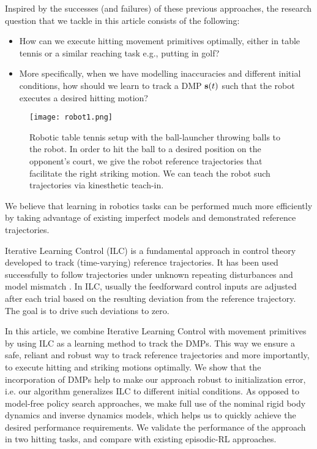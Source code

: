 Inspired by the successes (and failures) of these previous approaches, the research question that we tackle in this article consists of the following:
%
\begin{itemize}
\item How can we execute hitting movement primitives optimally, either in table tennis or a similar reaching task e.g., putting in golf?
%
\item More specifically, when we have modelling inaccuracies and different initial conditions, how should we learn to track a DMP $\boldsymbol{\mathrm{s}}(t)$ such that the robot executes a desired hitting motion?
\end{itemize}
%
\begin{figure}[b!]
\center
\texttt{[image: robot1.png]}			
\caption{Robotic table tennis setup with the ball-launcher throwing balls to the robot. In order to hit the ball to a desired position on the opponent's court, we give the robot reference trajectories that facilitate the right striking motion. We can teach the robot such trajectories via kinesthetic teach-in.}
\label{robot}
\end{figure}
%
\noindent We believe that learning in robotics tasks can be performed much more efficiently by taking advantage of existing imperfect models and demonstrated reference trajectories. 

Iterative Learning Control (ILC) is a fundamental approach in control theory developed to track (time-varying) reference trajectories. It has been used successfully to follow trajectories under unknown repeating disturbances and model mismatch \cite{Bristow06}. In ILC, usually the feedforward control inputs are adjusted after each trial based on the resulting deviation from the reference trajectory. The goal is to drive such deviations to zero. 

In this article, we combine Iterative Learning Control with movement primitives by using ILC as a learning method to track the DMPs. This way we ensure a safe, reliant and robust way to track reference trajectories and more importantly, to execute hitting and striking motions optimally. We show that the incorporation of DMPs help to make our approach robust to initialization error, i.e. our algorithm generalizes ILC to different initial conditions. As opposed to model-free policy search approaches, we make full use of the nominal rigid body dynamics and inverse dynamics models, which helps us to quickly achieve the desired performance requirements. We validate the performance of the approach in two hitting tasks, and compare with existing episodic-RL approaches.

